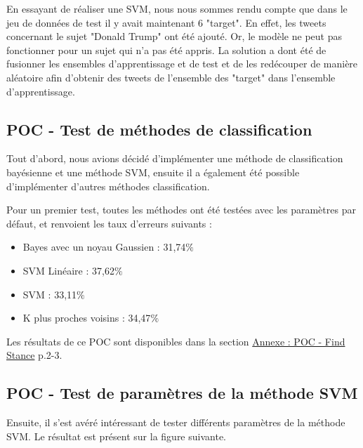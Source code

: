 En essayant de réaliser une SVM, nous nous sommes rendu compte que dans le jeu de données de test il y avait maintenant 6 "target". En effet, les tweets concernant le sujet "Donald Trump" ont été ajouté. Or, le modèle ne peut pas fonctionner pour un sujet qui n'a pas été appris. 
La solution a dont été de fusionner les ensembles d'apprentissage et de test et de les redécouper de manière aléatoire afin d'obtenir des tweets de l'ensemble des "target" dans l'ensemble d'apprentissage.

\subsection{POC - Test de méthodes de classification}

Tout d'abord, nous avions décidé d'implémenter une méthode de classification bayésienne et une méthode SVM, ensuite il a également été possible d'implémenter d'autres méthodes classification.

Pour un premier test, toutes les méthodes ont été testées avec les paramètres par défaut, et renvoient les taux d'erreurs suivants :
\begin{itemize}
\item Bayes avec un noyau Gaussien : 31,74$\%$
\item SVM Linéaire : 37,62$\%$
\item SVM : 33,11$\%$
\item K plus proches voisins : 34,47$\%$
\end{itemize}

Les résultats de ce POC sont disponibles dans la section \hyperref[annexe-stance-detection]{Annexe : POC - Find Stance} p.2-3.

\subsection{POC - Test de paramètres de la méthode SVM}

Ensuite, il s'est avéré intéressant de tester différents paramètres de la méthode SVM. Le résultat est présent sur la figure suivante.


